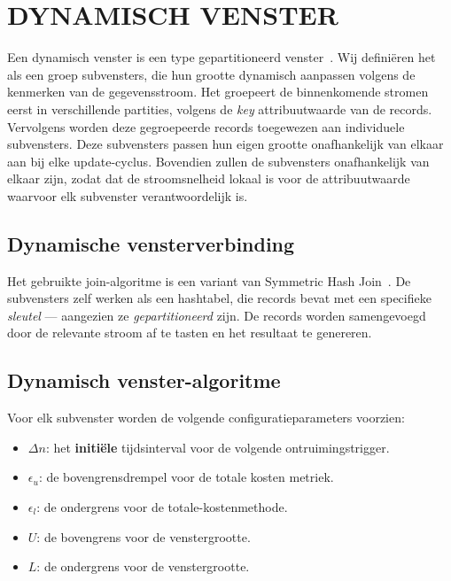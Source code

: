 \section{DYNAMISCH VENSTER}%
\label{sec:Dynamic Window}
Een dynamisch venster is een type gepartitioneerd venster~\cite{generic_window_sem}.
Wij definiëren het als een groep subvensters, die hun grootte dynamisch aanpassen volgens de kenmerken 
van de gegevensstroom. Het groepeert de binnenkomende stromen eerst in verschillende partities, volgens 
de \emph{key} attribuutwaarde van de records. Vervolgens worden deze gegroepeerde records toegewezen 
aan individuele subvensters. Deze subvensters passen hun eigen grootte onafhankelijk van elkaar aan 
bij elke update-cyclus. Bovendien zullen de subvensters onafhankelijk van elkaar zijn, zodat 
dat de stroomsnelheid lokaal is voor de attribuutwaarde waarvoor elk subvenster verantwoordelijk is. 

\subsection{Dynamische vensterverbinding}
\label{sub:Dynamic window join}

Het gebruikte join-algoritme is een variant van Symmetric Hash Join~\cite{symmetric_hash_join}. 
De subvensters zelf werken als een hashtabel, die records bevat met een 
specifieke \emph{sleutel} --- aangezien ze \emph{gepartitioneerd} zijn. 
De records worden samengevoegd door de relevante stroom af te tasten en het 
resultaat te genereren. 


\subsection{Dynamisch venster-algoritme}%
\label{sub:Dynamic window algorithm}
Voor elk subvenster worden de volgende configuratieparameters 
voorzien: 

\begin{itemize}
    \item $\Delta n$: het \textbf{initiële} tijdsinterval voor de volgende ontruimingstrigger. 
    \item $\epsilon_u$: de bovengrensdrempel voor de totale kosten metriek.
    \item $\epsilon_l$: de ondergrens voor de totale-kostenmethode. 
    \item $U$: de bovengrens voor de venstergrootte. 
    \item $L$: de ondergrens voor de venstergrootte. 
\end{itemize}

